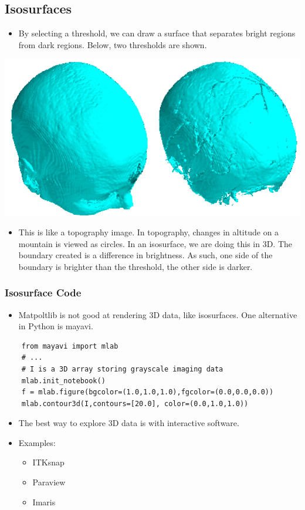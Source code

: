 \documentclass[10pt]{article}
\begin{document}
\subsection*{Isosurfaces}
\begin{itemize}
    \item By selecting a threshold, we can draw a surface that separates bright regions from dark regions.  Below, two thresholds are shown.
\end{itemize}
\begin{center}
    \includegraphics[width=\textwidth]{W1_15.png}
\end{center}
\begin{itemize}
    \item This is like a topography image.  In topography, changes in altitude on a mountain is viewed as circles.  In an isosurface, we are doing this in 3D.  The boundary created is a difference in brightness.  As such, one side of the boundary is brighter than the threshold, the other side is darker.
\end{itemize}
\subsubsection*{Isosurface Code}
\begin{itemize}
    \item Matpoltlib is not good at rendering 3D data, like isosurfaces.  One alternative in Python is mayavi.
\end{itemize}
\begin{verbatim}
    from mayavi import mlab
    # ...
    # I is a 3D array storing grayscale imaging data
    mlab.init_notebook()
    f = mlab.figure(bgcolor=(1.0,1.0,1.0),fgcolor=(0.0,0.0,0.0))
    mlab.contour3d(I,contours=[20.0], color=(0.0,1.0,1.0))
\end{verbatim}
\begin{itemize}
    \item The best way to explore 3D data is with interactive software.
    \item Examples:
    \begin{itemize}
        \item ITKsnap
        \item Paraview
        \item Imaris
    \end{itemize}
\end{itemize}
\end{document}
